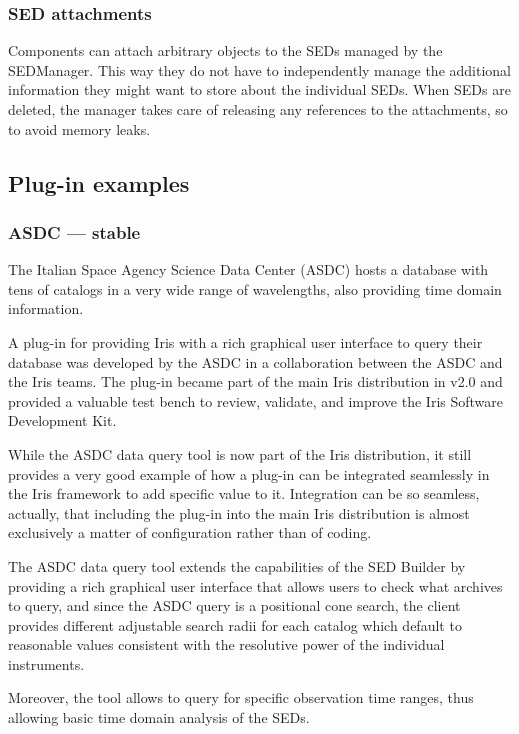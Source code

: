 \documentclass[final,5p]{elsarticle}
\begin{document}
\subsubsection{SED attachments}
Components can attach arbitrary objects to the SEDs managed by the SEDManager. This way they do not have to independently manage the additional information they might want to store about the individual SEDs. When SEDs are deleted, the manager takes care of releasing any references to the attachments, so to avoid memory leaks.



\subsection{Plug-in examples}
\subsubsection{ASDC --- stable}
The Italian Space Agency Science Data Center (ASDC) hosts a database with tens of catalogs in a very wide range of wavelengths, also providing time domain information.

A plug-in for providing Iris with a rich graphical user interface to query their database was developed by the ASDC in a collaboration between the ASDC and the Iris teams. The plug-in became part of the main Iris distribution in v2.0 and provided a valuable test bench to review, validate, and improve the Iris Software Development Kit.

While the ASDC data query tool is now part of the Iris distribution, it still provides a very good example of how a plug-in can be integrated seamlessly in the Iris framework to add specific value to it. Integration can be so seamless, actually, that including the plug-in into the main Iris distribution is almost exclusively a matter of configuration rather than of coding.

The ASDC data query tool extends the capabilities of the SED Builder by providing a rich graphical user interface that allows users to check what archives to query, and since the ASDC query is a positional cone search, the client provides different adjustable search radii for each catalog which default to reasonable values consistent with the resolutive power of the individual instruments.

Moreover, the tool allows to query for specific observation time ranges, thus allowing basic time domain analysis of the SEDs.
\end{document}
